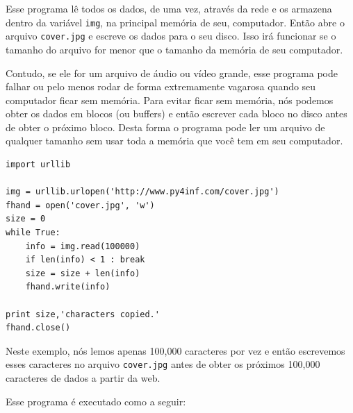 Esse programa lê todos os dados, de uma vez, através da rede e 
os armazena dentro da variável {\tt img}, na principal memória de seu,
computador. Então abre o arquivo {\tt cover.jpg} e escreve os dados para
o seu disco.  Isso irá funcionar se o tamanho do arquivo for menor que
o tamanho da memória de seu computador.

Contudo, se ele for um arquivo de áudio ou vídeo grande, esse programa
pode falhar ou pelo menos rodar de forma extremamente vagarosa quando seu
computador ficar sem memória.  Para evitar ficar sem memória, nós podemos
obter os dados em blocos (ou buffers) e então escrever cada bloco no disco
antes de obter o próximo bloco.  Desta forma o programa pode ler um arquivo
de qualquer tamanho sem usar toda a memória que você tem em seu computador.

\beforeverb
\begin{verbatim}
import urllib

img = urllib.urlopen('http://www.py4inf.com/cover.jpg')
fhand = open('cover.jpg', 'w')
size = 0
while True:
    info = img.read(100000)
    if len(info) < 1 : break
    size = size + len(info)
    fhand.write(info)

print size,'characters copied.'
fhand.close()
\end{verbatim}
\afterverb

Neste exemplo, nós lemos apenas 100,000 caracteres por vez e então 
escrevemos esses caracteres no arquivo {\tt cover.jpg} antes de obter
os próximos 100,000 caracteres de dados a partir da web.

Esse programa é executado como a seguir:

